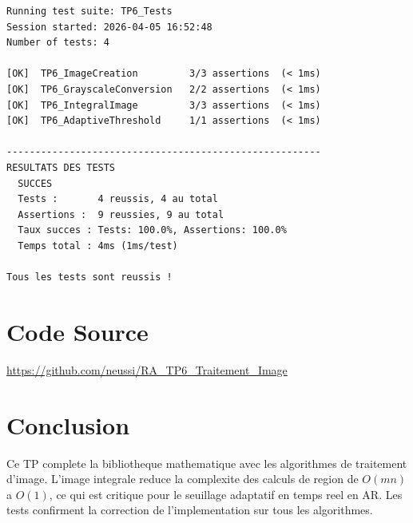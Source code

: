 \documentclass[12pt,a4paper]{article}
\begin{document}
\begin{lstlisting}[caption=Sortie de jenga test -- TP6]
Running test suite: TP6_Tests
Session started: 2026-04-05 16:52:48
Number of tests: 4

[OK]  TP6_ImageCreation         3/3 assertions  (< 1ms)
[OK]  TP6_GrayscaleConversion   2/2 assertions  (< 1ms)
[OK]  TP6_IntegralImage         3/3 assertions  (< 1ms)
[OK]  TP6_AdaptiveThreshold     1/1 assertions  (< 1ms)

-------------------------------------------------------
RESULTATS DES TESTS
  SUCCES
  Tests :       4 reussis, 4 au total
  Assertions :  9 reussies, 9 au total
  Taux succes : Tests: 100.0%, Assertions: 100.0%
  Temps total : 4ms (1ms/test)

Tous les tests sont reussis !
\end{lstlisting}

\section{Code Source}

\begin{center}
\href{https://github.com/neussi/RA_TP6_Traitement_Image}{https://github.com/neussi/RA\_TP6\_Traitement\_Image}
\end{center}

\section{Conclusion}

Ce TP complete la bibliotheque mathematique avec les algorithmes de traitement d'image.
L'image integrale reduce la complexite des calculs de region de $O(mn)$ a $O(1)$, ce qui
est critique pour le seuillage adaptatif en temps reel en AR. Les tests confirment la
correction de l'implementation sur tous les algorithmes.
\end{document}
